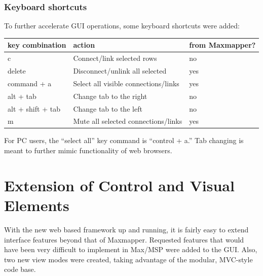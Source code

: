 
		\subsubsection{Keyboard shortcuts}

To further accelerate GUI operations, some keyboard shortcuts were added:

\begin{table}
	\centering
	\label{tab:list_view_shortcut_keys}
		\begin{tabular}{l  l  l}
		\hline\hline
		key combination&action&from Maxmapper?\\
		\hline
		c 					& Connect/link selected rows & no\\
		delete 				& Disconnect/unlink all selected & yes\\
		command + a 		& Select all visible connections/links & yes\\
		alt + tab 			& Change tab to the right & no\\
		alt + shift + tab 	& Change tab to the left & no\\ 
		m 					& Mute all selected connections/links & yes\\
		\end{tabular}
\end{table}

For PC users, the ``select all'' key command is ``control + a.'' Tab changing is meant to further mimic functionality of web browsers. 



\section{Extension of Control and Visual Elements} %
\label{sec:extension_of_control_and_visual_elements}

With the new web based framework up and running, it is fairly easy to extend interface features beyond that of Maxmapper. Requested features that would have been very difficult to implement in Max/MSP were added to the GUI. Also, two new view modes were created, taking advantage of the modular, MVC-style code base.

